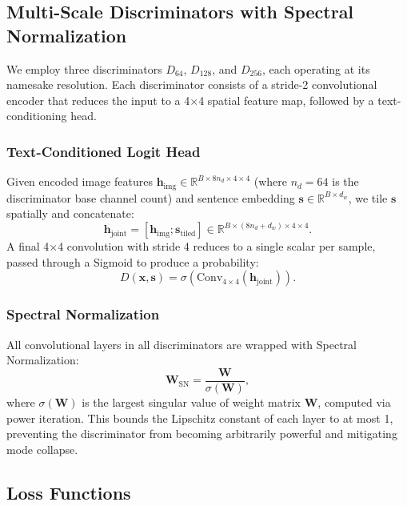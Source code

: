 \documentclass[conference]{IEEEtran}
\begin{document}
\subsection{Multi-Scale Discriminators with Spectral Normalization}
\label{sec:discriminators}

We employ three discriminators $D_{64}$, $D_{128}$, and $D_{256}$, each operating at its namesake resolution. Each discriminator consists of a stride-2 convolutional encoder that reduces the input to a 4$\times$4 spatial feature map, followed by a text-conditioning head.

\subsubsection{Text-Conditioned Logit Head}
Given encoded image features $\mathbf{h}_{\text{img}} \in \mathbb{R}^{B \times 8n_d \times 4 \times 4}$ (where $n_d=64$ is the discriminator base channel count) and sentence embedding $\mathbf{s} \in \mathbb{R}^{B \times d_w}$, we tile $\mathbf{s}$ spatially and concatenate:
\begin{equation}
    \mathbf{h}_{\text{joint}} = [\mathbf{h}_{\text{img}}; \mathbf{s}_{\text{tiled}}] \in \mathbb{R}^{B \times (8n_d + d_w) \times 4 \times 4}.
\end{equation}
A final 4$\times$4 convolution with stride 4 reduces to a single scalar per sample, passed through a Sigmoid to produce a probability:
\begin{equation}
    D(\mathbf{x}, \mathbf{s}) = \sigma\left( \text{Conv}_{4\times4}(\mathbf{h}_{\text{joint}}) \right).
\end{equation}

\subsubsection{Spectral Normalization}
All convolutional layers in all discriminators are wrapped with Spectral Normalization:
\begin{equation}
    \mathbf{W}_{\text{SN}} = \frac{\mathbf{W}}{\sigma(\mathbf{W})},
\end{equation}
where $\sigma(\mathbf{W})$ is the largest singular value of weight matrix $\mathbf{W}$, computed via power iteration. This bounds the Lipschitz constant of each layer to at most 1, preventing the discriminator from becoming arbitrarily powerful and mitigating mode collapse.

\subsection{Loss Functions}
\label{sec:losses}
\end{document}
